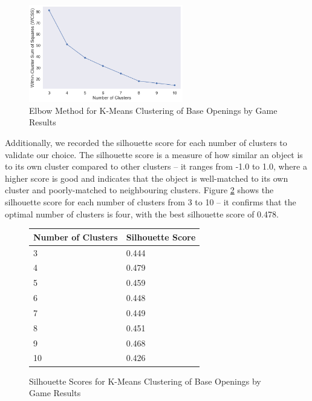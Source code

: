 \documentclass[a4paper, 11pt]{article}
\begin{document}
\begin{figure}[H]
    \centering
    \caption{Elbow Method for K-Means Clustering of Base Openings by Game Results}
    \label{fig:elbowMethodForBaseOpeningsClusteredByGameResults}
    \includegraphics[width=0.6\textwidth]{Elbow Method for Clustering of Base Opening by Results.png}
\end{figure}

Additionally, we recorded the silhouette score for each number of clusters to validate our choice. The silhouette score is a measure of how similar an object is to its own cluster compared to other clusters -- it ranges from -1.0 to 1.0, where a higher score is good and indicates that the object is well-matched to its own cluster and poorly-matched to neighbouring clusters. Figure \ref{fig:silhouetteScoresForBaseOpeningsClusteredByGameResults} shows the silhouette score for each number of clusters from 3 to 10 -- it confirms that the optimal number of clusters is four, with the best silhouette score of 0.478.

\begin{figure}[H]
    \centering
    \caption{Silhouette Scores for K-Means Clustering of Base Openings by Game Results}
    \label{fig:silhouetteScoresForBaseOpeningsClusteredByGameResults}
    \begin{tabular}{| l | l |} 
        \hline
        \bf{Number of Clusters} & \bf{Silhouette Score} \\ [0.5ex] 
        \hline
        3 & 0.444 \\
        \hline
        4 & 0.479 \\
        \hline
        5 & 0.459 \\
        \hline
        6 & 0.448 \\
        \hline
        7 & 0.449 \\
        \hline
        8 & 0.451 \\
        \hline
        9 & 0.468 \\
        \hline
        10 & 0.426 \\
        \hline
    \end{tabular}
\end{figure}
\end{document}
